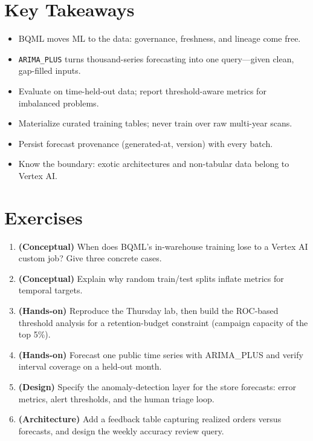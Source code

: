 \section*{Key Takeaways}
\begin{itemize}
    \item BQML moves ML to the data: governance, freshness, and lineage come free.
    \item \texttt{ARIMA\_PLUS} turns thousand-series forecasting into one query---given clean, gap-filled inputs.
    \item Evaluate on time-held-out data; report threshold-aware metrics for imbalanced problems.
    \item Materialize curated training tables; never train over raw multi-year scans.
    \item Persist forecast provenance (generated-at, version) with every batch.
    \item Know the boundary: exotic architectures and non-tabular data belong to Vertex AI.
\end{itemize}

\section{Exercises}
\begin{enumerate}
    \item \textbf{(Conceptual)} When does BQML's in-warehouse training lose to a Vertex AI custom job? Give three concrete cases.
    \item \textbf{(Conceptual)} Explain why random train/test splits inflate metrics for temporal targets.
    \item \textbf{(Hands-on)} Reproduce the Thursday lab, then build the ROC-based threshold analysis for a retention-budget constraint (campaign capacity of the top 5\%).
    \item \textbf{(Hands-on)} Forecast one public time series with ARIMA\_PLUS and verify interval coverage on a held-out month.
    \item \textbf{(Design)} Specify the anomaly-detection layer for the store forecasts: error metrics, alert thresholds, and the human triage loop.
    \item \textbf{(Architecture)} Add a feedback table capturing realized orders versus forecasts, and design the weekly accuracy review query.
\end{enumerate}
